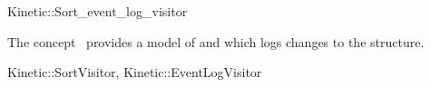 

\begin{ccRefClass}{Kinetic::Sort_event_log_visitor}


\ccDefinition
  
The concept \ccRefName\ provides a model of
 and  which logs changes to the structure.

\ccIsModel

Kinetic::SortVisitor, Kinetic::EventLogVisitor

\ccSeeAlso



\end{ccRefClass}


